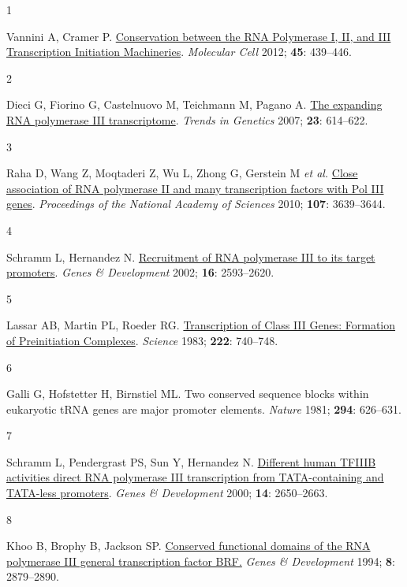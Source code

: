\documentclass[
  12pt,
]{article}
\newlength{\cslhangindent}
\newlength{\csllabelwidth}
\newlength{\cslentryspacingunit} %
\newenvironment{CSLReferences}[2] %
 {%
  \setlength{\parindent}{0pt}
  \ifodd #1
  \let\oldpar\par
  \def\par{\hangindent=\cslhangindent\oldpar}
  \fi
  \setlength{\parskip}{#2\cslentryspacingunit}
 }%
 {}
\newcommand{\CSLLeftMargin}[1]{\parbox[t]{\csllabelwidth}{#1}}
\newcommand{\CSLRightInline}[1]{\parbox[t]{\linewidth - \csllabelwidth}{#1}\break}
\begin{document}
\hypertarget{refs}{}
\begin{CSLReferences}{0}{0}
\leavevmode{}%
\CSLLeftMargin{1 }%
\CSLRightInline{Vannini A, Cramer P. \href{https://doi.org/10.1016/j.molcel.2012.01.023}{Conservation between the RNA Polymerase I, II, and III Transcription Initiation Machineries}. \emph{Molecular Cell} 2012; \textbf{45}: 439--446.}

\leavevmode{}%
\CSLLeftMargin{2 }%
\CSLRightInline{Dieci G, Fiorino G, Castelnuovo M, Teichmann M, Pagano A. \href{https://doi.org/10.1016/j.tig.2007.09.001}{The expanding RNA polymerase III transcriptome}. \emph{Trends in Genetics} 2007; \textbf{23}: 614--622.}

\leavevmode{}%
\CSLLeftMargin{3 }%
\CSLRightInline{Raha D, Wang Z, Moqtaderi Z, Wu L, Zhong G, Gerstein M \emph{et al.} \href{https://doi.org/10.1073/pnas.0911315106}{Close association of RNA polymerase II and many transcription factors with Pol III genes}. \emph{Proceedings of the National Academy of Sciences} 2010; \textbf{107}: 3639--3644.}

\leavevmode{}%
\CSLLeftMargin{4 }%
\CSLRightInline{Schramm L, Hernandez N. \href{https://doi.org/10.1101/gad.1018902}{Recruitment of RNA polymerase III to its target promoters}. \emph{Genes \& Development} 2002; \textbf{16}: 2593--2620.}

\leavevmode{}%
\CSLLeftMargin{5 }%
\CSLRightInline{Lassar AB, Martin PL, Roeder RG. \href{https://doi.org/10.1126/science.6356356}{Transcription of Class III Genes: Formation of Preinitiation Complexes}. \emph{Science} 1983; \textbf{222}: 740--748.}

\leavevmode{}%
\CSLLeftMargin{6 }%
\CSLRightInline{Galli G, Hofstetter H, Birnstiel ML. Two conserved sequence blocks within eukaryotic {tRNA} genes are major promoter elements. \emph{Nature} 1981; \textbf{294}: 626--631.}

\leavevmode{}%
\CSLLeftMargin{7 }%
\CSLRightInline{Schramm L, Pendergrast PS, Sun Y, Hernandez N. \href{https://doi.org/10.1101/gad.836400}{Different human TFIIIB activities direct RNA polymerase III transcription from TATA-containing and TATA-less promoters}. \emph{Genes \& Development} 2000; \textbf{14}: 2650--2663.}

\leavevmode{}%
\CSLLeftMargin{8 }%
\CSLRightInline{Khoo B, Brophy B, Jackson SP. \href{https://doi.org/10.1101/gad.8.23.2879}{Conserved functional domains of the RNA polymerase III general transcription factor BRF.} \emph{Genes \& Development} 1994; \textbf{8}: 2879--2890.}


\end{CSLReferences}
\end{document}
